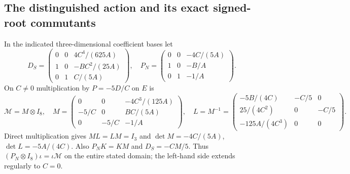 \subsection{The distinguished action and its exact signed-root commutants}
In the indicated three-dimensional coefficient bases let
\[
 D_S=\begin{pmatrix}0&0&4C^4/(625A)\\1&0&-BC^2/(25A)\\0&1&C/(5A)\end{pmatrix},
 \quad
 P_N=\begin{pmatrix}0&0&-4C/(5A)\\1&0&-B/A\\0&1&-1/A\end{pmatrix}.
                                                               \tag{ETR8}
\]
On $C\ne0$ multiplication by $P=-5D/C$ on $E$ is
\[
 \mathcal M=M\otimes I_8,\quad
 M=\begin{pmatrix}0&0&-4C^3/(125A)\\-5/C&0&BC/(5A)\\0&-5/C&-1/A\end{pmatrix},
 \quad
 L=M^{-1}=\begin{pmatrix}-5B/(4C)&-C/5&0\\25/(4C^2)&0&-C/5\\-125A/(4C^3)&0&0\end{pmatrix}.
                                                               \tag{ETR9}
\]
Direct multiplication gives $ML=LM=I_3$ and
$\det M=-4C/(5A)$, $\det L=-5A/(4C)$. Also
$P_NK=KM$ and $D_S=-CM/5$. Thus $(P_N\otimes I_8)\iota
=\iota\mathcal M$ on the entire stated domain; the left-hand side
extends regularly to $C=0$.

